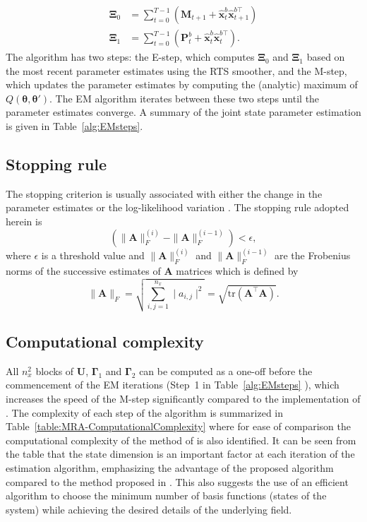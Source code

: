 \documentclass[review,authoryear,3p]{elsarticle}
\begin{document}
\begin{align}
\boldsymbol\Xi_0&=\sum_{t=0}^{T-1}\left(\mathbf M_{t+1}+\mathbf{\hat x}_t^b\mathbf{\hat x}_{t+1}^{b\top}\right) \label{eq:Xi0} \\
 \boldsymbol\Xi_1&=\sum_{t=0}^{T-1}\left(\mathbf P_t^b+\mathbf{\hat x}_t^b\mathbf{\hat x}_t^{b\top}\right).  \label{eq:Xi1}
\end{align} 
The algorithm has two steps: the E-step, which computes $\boldsymbol\Xi_0$ and $\boldsymbol\Xi_1$ based on the most recent parameter estimates using the RTS smoother, and the M-step, which updates the parameter estimates by computing the (analytic) maximum of $Q(\boldsymbol\theta,\boldsymbol\theta')$. The EM algorithm iterates between these two steps until the parameter estimates converge. A summary of the joint state parameter estimation is given in Table~\ref{alg:EMsteps}.   
\subsection{Stopping rule}
The stopping criterion is usually associated with either the change in the parameter estimates or the log-likelihood variation \citep{McLachlan1997}. The stopping rule adopted herein is
\begin{equation}
 \left(\parallel \mathbf{A} \parallel_{F}^{(i)}-\parallel \mathbf{A} \parallel_{F}^{(i-1)}\right)<\epsilon,
 \end{equation}
 where $\epsilon$ is a threshold value and $\parallel \mathbf{A} \parallel_{F}^{(i)}$ and $ \parallel \mathbf{A} \parallel_{F}^{(i-1)}$ are the Frobenius norms  of the successive estimates of $\mathbf{A} $ matrices which is defined by \citet{Meyer2000}
 \begin{equation}
  \parallel \mathbf{A} \parallel_{F}=\sqrt{\sum_{i,j=1}^{n_x}\mid a_{i,j} \mid^2}=\sqrt{\mathrm{tr} (\mathbf A^{\top}\mathbf A)}.
 \end{equation}
\subsection{Computational complexity} 
All $n_x^2$ blocks of $\mathbf U$, $\boldsymbol\Gamma_1$ and $\boldsymbol\Gamma_2$  can be computed as a one-off before the commencement of the EM iterations (Step~1 in Table~\ref{alg:EMsteps} ), which increases the speed of the M-step significantly compared to the implementation of \citet{Dewar2009}. The complexity of each step of the algorithm is summarized in Table~\ref{table:MRA-ComputationalComplexity} where for ease of comparison the computational complexity of the method of \citet{Dewar2009} is also identified. It can be seen from the table that the state dimension is an important factor at each iteration of the estimation algorithm, emphasizing the advantage of the proposed algorithm compared to the method proposed in \citet{Dewar2009}. This also suggests the use of an efficient algorithm to choose the minimum number of basis functions (states of the system) while achieving the desired details of the underlying field.  
\end{document}
